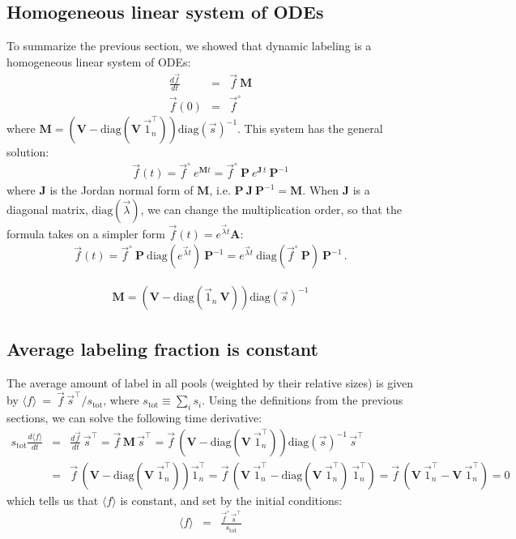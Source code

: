 \documentclass{article}
\newcommand{\finit}{\ensuremath{\vec{f}^\circ}}
\newcommand{\favg}{\ensuremath{\langle f \rangle}}
\newcommand{\stot}{\ensuremath{s_\text{tot}}}
\begin{document}
\subsection{Homogeneous linear system of ODEs}
To summarize the previous section, we showed that dynamic labeling is a homogeneous linear system of ODEs:
\begin{eqnarray}\label{eq:homogenous}
    \frac{d\vec{f}}{d t} &=& \vec{f}~\mathbf{M} \\
    \vec{f}(0) &=& \finit
\end{eqnarray}
where $\mathbf{M} = \left( \mathbf{V} - \text{diag}(\mathbf{V}~\vec{1}_n^\top) \right) \text{diag}(\vec{s})^{-1}$. This system has the general solution:
\begin{eqnarray}
    \vec{f}(t) = \finit~e^{\mathbf{M} t} =  \finit~\mathbf{P}~e^{\mathbf{J}\,t}~\mathbf{P}^{-1}
\end{eqnarray}
where $\mathbf{J}$ is the Jordan normal form of $\mathbf{M}$, i.e. $\mathbf{P}~\mathbf{J}~\mathbf{P}^{-1} = \mathbf{M}$. When $\mathbf{J}$ is a diagonal matrix, $\text{diag}(\vec{\lambda})$, we can change the multiplication order, so that the formula takes on a simpler form $\vec{f}(t) = e^{\vec{\lambda} t}\mathbf{A}$:
\begin{eqnarray}\label{eq:homogenous_solution}
    \vec{f}(t) =
    \finit~\mathbf{P} ~ \text{diag}\left(e^{\vec{\lambda} t}\right) ~ \mathbf{P}^{-1} =
    e^{\vec{\lambda} t} ~ \text{diag}\left(\finit~\mathbf{P}\right) ~ \mathbf{P}^{-1}\,.
\end{eqnarray}

\begin{eqnarray}
\mathbf{M} = \left( \mathbf{V} - \text{diag}(\vec{1}_n~\mathbf{V}) \right) \text{diag}(\vec{s})^{-1}
\end{eqnarray}

\subsection{Average labeling fraction is constant}
The average amount of label in all pools (weighted by their relative sizes) is given by $\favg ~=~ \vec{f} \, \vec{s}^\top / \stot$, where $\stot \equiv \sum_i s_i$. Using the definitions from the previous sections, we can solve the following time derivative:
\begin{eqnarray}
\stot\frac{d\favg}{dt} &=& \frac{d\vec{f}}{dt} \, \vec{s}^\top =
\vec{f} \, \mathbf{M} \, \vec{s}^\top = 
\vec{f} \, \left( \mathbf{V} - \text{diag}(\mathbf{V}~\vec{1}_n^\top) \right) \text{diag}(\vec{s})^{-1} \, \vec{s}^\top \nonumber\\
&=& 
\vec{f} \, \left( \mathbf{V} - \text{diag}(\mathbf{V}~\vec{1}_n^\top) \right) \vec{1}_n^\top =
\vec{f} \, \left( \mathbf{V}~\vec{1}_n^\top - \text{diag}(\mathbf{V}~\vec{1}_n^\top)~\vec{1}_n^\top \right) 
= \vec{f} \, \left( \mathbf{V}~\vec{1}_n^\top - \mathbf{V}~\vec{1}_n^\top \right) = 0
\label{eq:total_label}
\end{eqnarray}
which tells us that $\favg$ is constant, and set by the initial conditions:
\begin{eqnarray}
	\favg &=& \frac{\finit \, \vec{s}^\top}{\stot}
\end{eqnarray}
\end{document}
